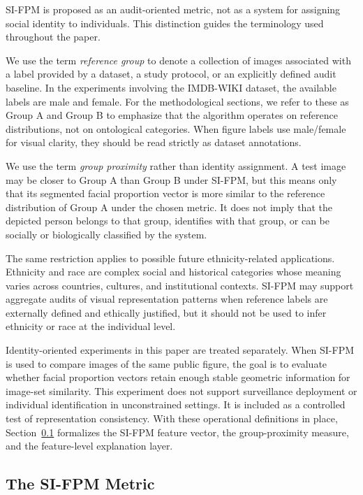 \documentclass{article}
\begin{document}
SI-FPM is proposed as an audit-oriented metric, not as a system for assigning social identity to individuals. This distinction guides the terminology used throughout the paper.

We use the term \emph{reference group} to denote a collection of images associated with a label provided by a dataset, a study protocol, or an explicitly defined audit baseline. In the experiments involving the IMDB-WIKI dataset, the available labels are male and female. For the methodological sections, we refer to these as Group A and Group B to emphasize that the algorithm operates on reference distributions, not on ontological categories. When figure labels use male/female for visual clarity, they should be read strictly as dataset annotations.

We use the term \emph{group proximity} rather than identity assignment. A test image may be closer to Group A than Group B under SI-FPM, but this means only that its segmented facial proportion vector is more similar to the reference distribution of Group A under the chosen metric. It does not imply that the depicted person belongs to that group, identifies with that group, or can be socially or biologically classified by the system.

The same restriction applies to possible future ethnicity-related applications. Ethnicity and race are complex social and historical categories whose meaning varies across countries, cultures, and institutional contexts. SI-FPM may support aggregate audits of visual representation patterns when reference labels are externally defined and ethically justified, but it should not be used to infer ethnicity or race at the individual level.

Identity-oriented experiments in this paper are treated separately. When SI-FPM is used to compare images of the same public figure, the goal is to evaluate whether facial proportion vectors retain enough stable geometric information for image-set similarity. This experiment does not support surveillance deployment or individual identification in unconstrained settings. It is included as a controlled test of representation consistency. With these operational definitions in place, Section~\ref{metric} formalizes the SI-FPM feature vector, the group-proximity measure, and the feature-level explanation layer.


\subsection{The SI-FPM Metric}
\label{metric}
\end{document}
